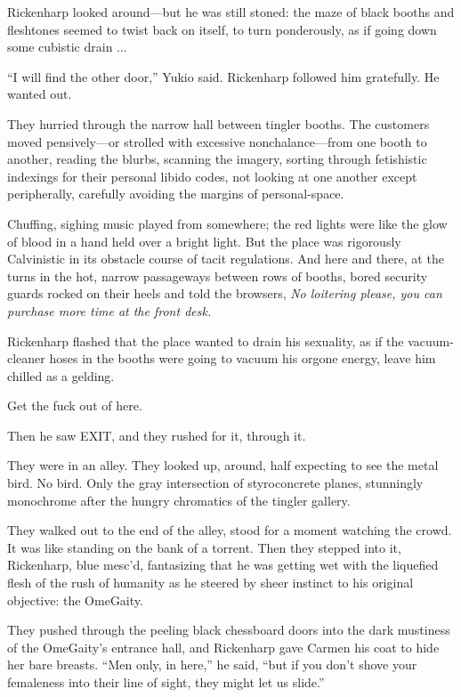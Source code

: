 Rickenharp looked around---but he was still stoned: the maze of black booths and fleshtones seemed to twist back on itself, to turn ponderously, as if going down some cubistic drain ...

``I will find the other door,'' Yukio said. Rickenharp followed him gratefully. He wanted out.

They hurried through the narrow hall between tingler booths. The customers moved pensively---or strolled with excessive nonchalance---from one booth to another, reading the blurbs, scanning the imagery, sorting through fetishistic indexings for their personal libido codes, not looking at one another except peripherally, carefully avoiding the margins of personal-space.

Chuffing, sighing music played from somewhere; the red lights were like the glow of blood in a hand held over a bright light. But the place was rigorously Calvinistic in its obstacle course of tacit regulations. And here and there, at the turns in the hot, narrow passageways between rows of booths, bored security guards rocked on their heels and told the browsers, \textit{No loitering please, you can purchase more time at the front desk.}

Rickenharp flashed that the place wanted to drain his sexuality, as if the vacuum-cleaner hoses in the booths were going to vacuum his orgone energy, leave him chilled as a gelding.

Get the fuck out of here.

Then he saw EXIT, and they rushed for it, through it.

They were in an alley. They looked up, around, half expecting to see the metal bird. No bird. Only the gray intersection of styroconcrete planes, stunningly monochrome after the hungry chromatics of the tingler gallery.

They walked out to the end of the alley, stood for a moment watching the crowd. It was like standing on the bank of a torrent. Then they stepped into it, Rickenharp, blue mesc'd, fantasizing that he was getting wet with the liquefied flesh of the rush of humanity as he steered by sheer instinct to his original objective: the OmeGaity.

They pushed through the peeling black chessboard doors into the dark mustiness of the OmeGaity's entrance hall, and Rickenharp gave Carmen his coat to hide her bare breasts. ``Men only, in here,'' he said, ``but if you don't shove your femaleness into their line of sight, they might let us slide.''


